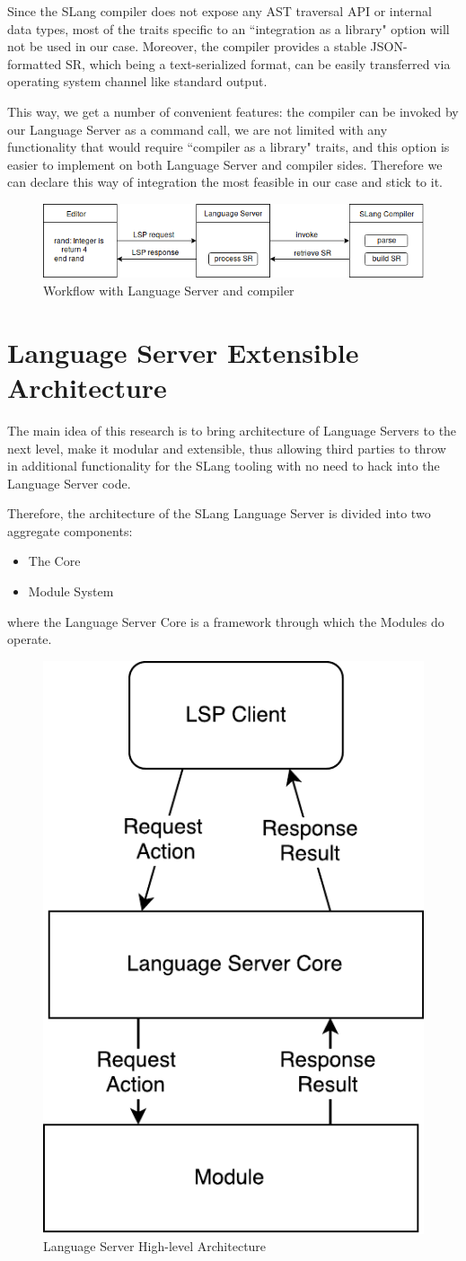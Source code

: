 Since the SLang\cite{Zouev2017} compiler does not expose any AST traversal API or internal data types, most of 
the traits specific to an ``integration as a library" option will not be used in our case.
Moreover, the compiler provides a stable JSON-formatted SR, which being a text-serialized format, 
can be easily transferred via operating system channel like standard output\cite{TheOpenGroup1997}.

This way, we get a number of convenient features: the compiler can be invoked by our Language Server as a command call, we are not limited 
with any functionality that would require ``compiler as a library" traits, and this option
is easier to implement on both Language Server and compiler sides.
Therefore we can declare this way of integration the most feasible in our case and stick to it.

\begin{figure}[H]
    \centering
    \includegraphics[width=1.0\textwidth]{figs/compiler_integration.png}
    \caption{Workflow with Language Server and compiler}
\end{figure}

\section{Language Server Extensible Architecture}
\label{sec:met:arch}
The main idea of this research is to bring architecture of Language Servers to the next level,
make it modular and extensible, thus allowing third parties to throw in additional functionality for the SLang tooling
with no need to hack into the Language Server code.

Therefore, the architecture of the SLang Language Server is divided into two aggregate components:
\begin{itemize}
    \item The Core
    \item Module System 
\end{itemize}
where the Language Server Core is a framework through which the Modules do operate.

\begin{figure}[H]
    \centering
    \includegraphics[width=.3\textwidth]{figs/highlevel_architecture.pdf}
    \caption{Language Server High-level Architecture}
\end{figure}

